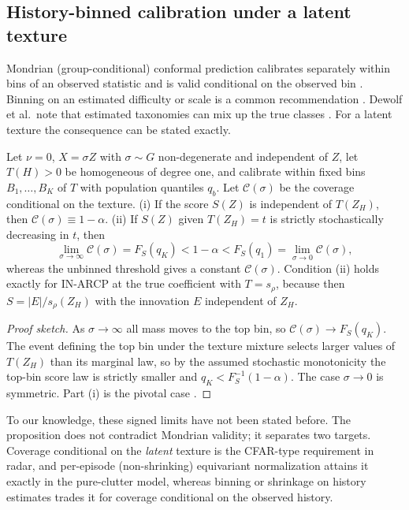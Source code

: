 \subsection{History-binned calibration under a latent texture}
Mondrian (group-conditional) conformal prediction calibrates separately within bins of an observed statistic and is valid conditional on the observed bin \cite{vovk2012,bostrom2020}. Binning on an estimated difficulty or scale is a common recommendation \cite{bostrom2020,dewolf2025}. Dewolf et al.\ note that estimated taxonomies can mix up the true classes \cite[\S5.2]{dewolf2025}. For a latent texture the consequence can be stated exactly.
\begin{proposition}\label{prop:mondrian}
Let $\nu=0$, $X=\sigma Z$ with $\sigma\sim G$ non-degenerate and independent of $Z$, let $T(H)>0$ be homogeneous of degree one, and calibrate within fixed bins $B_1,\dots,B_K$ of $T$ with population quantiles $q_b$. Let $\mathcal C(\sigma)$ be the coverage conditional on the texture.
(i) If the score $S(Z)$ is independent of $T(Z_H)$, then $\mathcal C(\sigma)\equiv1-\alpha$.
(ii) If $S(Z)$ given $T(Z_H)=t$ is strictly stochastically decreasing in $t$, then
\[
\lim_{\sigma\to\infty}\mathcal C(\sigma)=F_S(q_K)<1-\alpha<F_S(q_1)=\lim_{\sigma\to0}\mathcal C(\sigma),
\]
whereas the unbinned threshold gives a constant $\mathcal C(\sigma)$.
Condition (ii) holds exactly for IN-ARCP at the true coefficient with $T=s_\rho$, because then $S=|E|/s_\rho(Z_H)$ with the innovation $E$ independent of $Z_H$.
\end{proposition}
\begin{proof}[Proof sketch]
As $\sigma\to\infty$ all mass moves to the top bin, so $\mathcal C(\sigma)\to F_S(q_K)$. The event defining the top bin under the texture mixture selects larger values of $T(Z_H)$ than its marginal law, so by the assumed stochastic monotonicity the top-bin score law is strictly smaller and $q_K<F_S^{-1}(1-\alpha)$. The case $\sigma\to0$ is symmetric. Part (i) is the pivotal case \cite[Cor.~1]{dewolf2025}.
\end{proof}
To our knowledge, these signed limits have not been stated before. The proposition does not contradict Mondrian validity; it separates two targets. Coverage conditional on the \emph{latent} texture is the CFAR-type requirement in radar, and per-episode (non-shrinking) equivariant normalization attains it exactly in the pure-clutter model, whereas binning or shrinkage on history estimates trades it for coverage conditional on the observed history.

